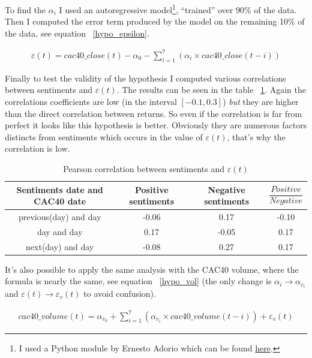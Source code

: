 \documentclass[12pt]{report}
\begin{document}
			To find the $\alpha_i$ I used an autoregressive model\footnote{I used a Python module by Ernesto Adorio which can be found \href{http://adorio-research.org/wordpress/?p=4551}{here}.}, ``trained'' over 90\% of the data. Then I computed the error term produced by the model on the remaining 10\% of the data, see equation ~\ref{hypo_epsilon}.

			\begin{eqnarray}
				\varepsilon(t) = cac40\_close(t) - \alpha_0 - \sum_{i = 1}^{7} \left(\alpha_i\times{}cac40\_close(t - i)\right)\label{hypo_epsilon}
			\end{eqnarray}

			Finally to test the validity of the hypothesis I computed various correlations between sentiments and $\varepsilon(t)$. The results can be seen in the table ~\ref{pearson_cac_ar}. Again the correlations coefficients are low (in the interval $[-0.1, 0.3]$) \emph{but} they are higher than the direct correlation between returns. So even if the correlation is far from perfect it looks like this hypothesis is better. Obviously they are numerous factors distincts from sentiments which occurs in the value of $\varepsilon(t)$, that's why the correlation is low.

			\begin{table}
			\begin{tabular}{|c || c | c | c|}
				\hline
				Sentiments date and CAC40 date & Positive sentiments & Negative sentiments & $\dfrac{Positive}{Negative}$\\
				\hline
				previous(day) and day & -0.06 & 0.17 & -0.10\\
				\hline
				day and day & 0.17 & -0.05 & 0.17\\
				\hline
				next(day) and day & -0.08 & 0.27 & 0.17\\
				\hline
			\end{tabular}

			\caption{Pearson correlation between sentiments and $\varepsilon(t)$\label{pearson_cac_ar}}
			\end{table}

			It's also possible to apply the same analysis with the CAC40 volume, where the formula is nearly the same, see equation ~\ref{hypo_vol} (the only change is $\alpha_i \rightarrow \alpha_{v_i}$ and $\varepsilon(t) \rightarrow \varepsilon_v(t)$ to avoid confusion).

			\begin{eqnarray}
				cac40\_volume(t) = \alpha_{v_0} + \sum_{i = 1}^{7}\left(\alpha_{v_i}\times{}cac40\_volume(t - i)\right) + \varepsilon_v(t)\label{hypo_vol}
			\end{eqnarray}
\end{document}
